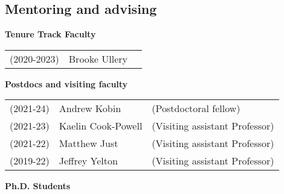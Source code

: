 \documentclass[margin,line]{res}
\newcommand{\defi}[1]{\textsf{#1}} 				%
\begin{document}
\begin{resume}


\section{\sc Mentoring and advising}



{\bf Tenure Track Faculty}
\vspace*{-.1in}

\begin{tabular}{lll}
  (2020-2023) & \defi{Brooke Ullery} & 
\end{tabular}

{\bf Postdocs and visiting faculty}
\vspace*{-.1in}

\begin{tabular}{lll}
  (2021-24) & \defi{Andrew Kobin} & (Postdoctoral fellow)
    \vspace{4pt}\\
  (2021-23) & \defi{Kaelin Cook-Powell} & (Visiting assistant Professor)
    \vspace{4pt}\\    
  (2021-22) & \defi{Matthew Just} & (Visiting assistant Professor)
    \vspace{4pt}\\  
  (2019-22) & \defi{Jeffrey Yelton} & (Visiting assistant Professor)
    \vspace{4pt}\\
\end{tabular}

{\bf Ph.D. Students}
\vspace*{-.1in}


\end{resume}
\end{document}
